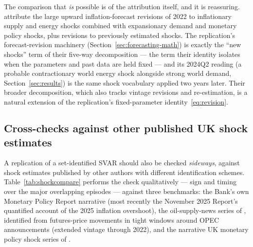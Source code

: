 The comparison that \emph{is} possible is of the attribution itself, and it is reassuring. \citet{brignone2026} attribute the large upward inflation-forecast revisions of 2022 to inflationary supply and energy shocks combined with expansionary demand and monetary policy shocks, plus revisions to previously estimated shocks. The replication's forecast-revision machinery (Section~\ref{sec:forecasting-math}) is exactly the ``new shocks'' term of their five-way decomposition --- the term their identity isolates when the parameters and past data are held fixed --- and its 2024Q2 reading (a probable contractionary world energy shock alongside strong world demand, Section~\ref{sec:results}) is the same shock vocabulary applied two years later. Their broader decomposition, which also tracks vintage revisions and re-estimation, is a natural extension of the replication's fixed-parameter identity~\eqref{eq:revision}.

\subsection{Cross-checks against other published UK shock estimates}
\label{sec:comparison-shocks}

A replication of a set-identified SVAR should also be checked \emph{sideways}, against shock estimates published by other authors with different identification schemes. Table~\ref{tab:shockcompare} performs the check qualitatively --- sign and timing over the major overlapping episodes --- against three benchmarks: the Bank's own Monetary Policy Report narrative (most recently the November 2025 Report's quantified account of the 2025 inflation overshoot), the oil-supply-news series of \citet{kanzig2021}, identified from futures-price movements in tight windows around OPEC announcements (extended vintage through 2022), and the narrative UK monetary policy shock series of \citet{cloyne2016}.

